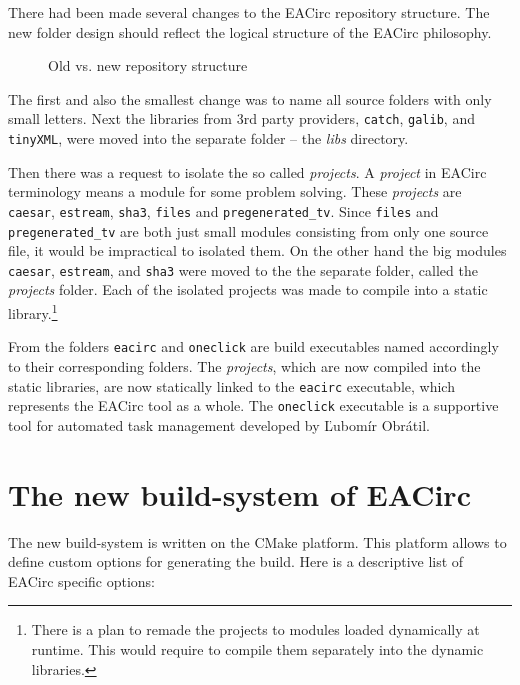 \documentclass[12pt,oneside]{fithesis2}
\begin{document}
There had been made several changes to the EACirc repository structure. The new folder design should reflect the logical structure of the EACirc philosophy.

	\begin{figure}[H]
	\centering
	
	\caption{Old vs. new repository structure}
	\end{figure}
	
\noindent
The first and also the smallest change was to name all source folders with only small letters. Next the libraries from 3rd party providers, \texttt{catch}, \texttt{galib}, and \texttt{tinyXML}, were moved into the separate folder -- the \emph{libs} directory.

Then there was a request to isolate the so called \emph{projects}. A \emph{project} in EACirc terminology means a module for some problem solving. These \emph{projects} are \texttt{caesar}, \texttt{estream}, \texttt{sha3}, \texttt{files} and \texttt{pregenerated\_tv}. Since \texttt{files} and \texttt{pregenerated\_tv} are both just small modules consisting from only one source file, it would be impractical to isolated them. On the other hand the big modules \texttt{caesar}, \texttt{estream}, and \texttt{sha3} were moved to the the separate folder, called the \emph{projects} folder. Each of the isolated projects was made to compile into a static library.\footnote{There is a plan to remade the projects to modules loaded dynamically at runtime. This would require to compile them separately into the dynamic libraries.}

From the folders \texttt{eacirc} and \texttt{oneclick} are build executables named accordingly to their corresponding folders. The \emph{projects}, which are now compiled into the static libraries, are now statically linked to the \texttt{eacirc} executable, which represents the EACirc tool as a whole. The \texttt{oneclick} executable is a supportive tool for automated task management developed by Ľubomír Obrátil. \cite{oneclick}

\section{The new build-system of EACirc}

The new build-system is written on the CMake platform. This platform allows to define custom options for generating the build. Here is a descriptive list of EACirc specific options:
\end{document}

